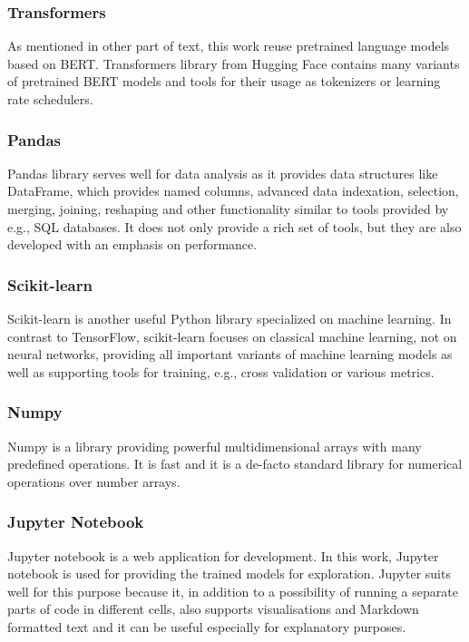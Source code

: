 \subsubsection{Transformers} 
As mentioned in other part of text, this work reuse pretrained language models based on BERT. Transformers library from Hugging Face\citep{Wolf2019HuggingFacesTS} contains many variants of pretrained BERT models and tools for their usage as tokenizers or learning rate schedulers.
\subsubsection{Pandas}
Pandas library \citep{reback2020pandas} serves well for data analysis as it provides data structures like DataFrame, which provides named columns, advanced data indexation, selection, merging, joining, reshaping and other functionality similar to tools provided by e.g., SQL databases. It does not only provide a rich set of tools, but they are also developed with an emphasis on performance.
\subsubsection{Scikit-learn}
Scikit-learn \citep{scikit-learn}  is another useful Python library specialized on machine learning. In contrast to TensorFlow, scikit-learn focuses on classical machine learning, not on neural networks, providing all important variants of machine learning models as well as supporting tools for training, e.g., cross validation or various metrics.
\subsubsection{Numpy}
Numpy \citep{harris2020array} is a library providing powerful multidimensional arrays with many predefined operations. It is fast and it is a de-facto
standard library for numerical operations over number arrays.
\subsubsection{Jupyter Notebook}
Jupyter notebook \citep{jupyter} is a web application for development. In this work, Jupyter notebook is used for providing the trained models for exploration. %
Jupyter suits well for this purpose because it, in addition to a possibility of running a separate parts of code in different cells, also supports visualisations and Markdown formatted text and it can be useful especially for explanatory purposes.




